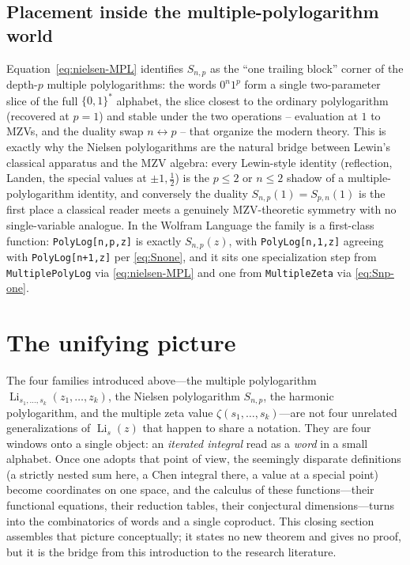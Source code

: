 \documentclass[11pt]{article}
\DeclareMathOperator{\Li}{Li}
\theoremstyle{plain}
\theoremstyle{remark}
\begin{document}
\subsection{Placement inside the multiple-polylogarithm world}

Equation~\eqref{eq:nielsen-MPL} identifies $S_{n,p}$ as the ``one trailing block'' corner of the depth-$p$ multiple polylogarithms: the words $0^{n}1^{p}$ form a single two-parameter slice of the full $\{0,1\}^{*}$ alphabet, the slice closest to the ordinary polylogarithm (recovered at $p=1$) and stable under the two operations -- evaluation at $1$ to MZVs, and the duality swap $n\leftrightarrow p$ -- that organize the modern theory. This is exactly why the Nielsen polylogarithms are the natural bridge between Lewin's classical apparatus and the MZV algebra: every Lewin-style identity (reflection, Landen, the special values at $\pm1,\tfrac12$) is the $p\le2$ or $n\le2$ shadow of a multiple-polylogarithm identity, and conversely the duality $S_{n,p}(1)=S_{p,n}(1)$ is the first place a classical reader meets a genuinely MZV-theoretic symmetry with no single-variable analogue. In the Wolfram Language the family is a first-class function: \texttt{PolyLog[n,p,z]} is exactly $S_{n,p}(z)$, with \texttt{PolyLog[n,1,z]} agreeing with \texttt{PolyLog[n+1,z]} per \eqref{eq:Snone}, and it sits one specialization step from \texttt{MultiplePolyLog} via \eqref{eq:nielsen-MPL} and one from \texttt{MultipleZeta} via \eqref{eq:Snp-one}.


\section{The unifying picture}

The four families introduced above---the multiple polylogarithm $\Li_{s_1,\dots,s_k}(z_1,\dots,z_k)$, the Nielsen polylogarithm $S_{n,p}$, the harmonic polylogarithm, and the multiple zeta value $\zeta(s_1,\dots,s_k)$---are not four unrelated generalizations of $\Li_s(z)$ that happen to share a notation. They are four windows onto a single object: an \emph{iterated integral} read as a \emph{word} in a small alphabet. Once one adopts that point of view, the seemingly disparate definitions (a strictly nested sum here, a Chen integral there, a value at a special point) become coordinates on one space, and the calculus of these functions---their functional equations, their reduction tables, their conjectural dimensions---turns into the combinatorics of words and a single coproduct. This closing section assembles that picture conceptually; it states no new theorem and gives no proof, but it is the bridge from this introduction to the research literature.
\end{document}
